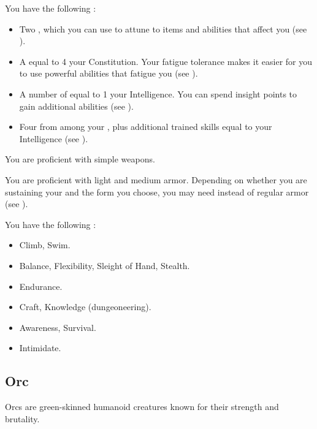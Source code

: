              You have the following :
            \begin{itemize}
                \item Two , which you can use to attune to items and abilities that affect you (see ).
                \item A  equal to 4 \add your Constitution.
                    Your fatigue tolerance makes it easier for you to use powerful abilities that fatigue you (see ).
                \item A number of  equal to 1 \add your Intelligence.
                    You can spend insight points to gain additional abilities (see ).
                \item Four  from among your , plus additional trained skills equal to your Intelligence (see ).
            \end{itemize}

            You are proficient with simple weapons.

            You are proficient with light and medium armor.
            Depending on whether you are sustaining your  and the form you choose, you may need  instead of regular armor (see ).

            You have the following :
            \begin{itemize}
                \item {} Climb, Swim.
                \item {} Balance, Flexibility, Sleight of Hand, Stealth.
                \item {} Endurance.
                \item {} Craft, Knowledge (dungeoneering).
                \item {} Awareness, Survival.
                \item {} Intimidate.
            \end{itemize}

    \subsection{Orc}
        Orcs are green-skinned humanoid creatures known for their strength and brutality.

